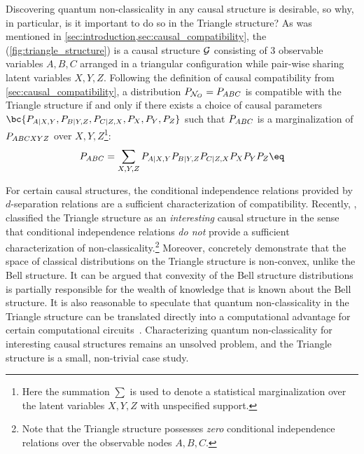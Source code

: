 \documentclass[aps, 10pt, english, twoside, pra, nofootinbib, tightenlines, longbibliography, superscriptaddress]{revtex4-1}
\begin{document}
    Discovering quantum non-classicality in any causal structure is desirable, so why, in particular, is it important to do so in the Triangle structure? As was mentioned in \cref{sec:introduction,sec:causal_compatibility}, the  (\cref{fig:triangle_structure}) is a causal structure $\mathcal{G}$ consisting of $3$ observable variables $A, B, C$ arranged in a triangular configuration while pair-wise sharing latent variables $X, Y, Z$. Following the definition of causal compatibility from \cref{sec:causal_compatibility}, a distribution $\prob[\nodes_{O}] = \prob[ABC]$ is compatible with the Triangle structure if and only if there exists a choice of causal parameters $\bc{\prob[A|X,Y],\prob[B|Y,Z],\prob[C|Z,X],\prob[X],\prob[Y],\prob[Z]}$ such that
    $\prob[ABC]$ is a marginalization of $\prob[ABCXYZ]$ over $X, Y, Z$\footnote{Here the summation $\sum$ is used to denote a statistical marginalization over the latent variables $X,Y,Z$ with unspecified support.}:
    \[ \prob[ABC] = \sum_{X,Y,Z}\prob[A|X,Y]\prob[B|Y,Z]\prob[C|Z,X]\prob[X]\prob[Y]\prob[Z] \eq \label{eq:triangle_compatibility} \]

    For certain causal structures, the conditional independence relations provided by $d$-separation relations are a sufficient characterization of compatibility. Recently, \citet{Henson_2014}, classified the Triangle structure as an \textit{interesting} causal structure in the sense that conditional independence relations \textit{do not} provide a sufficient characterization of non-classicality.\footnote{Note that the Triangle structure possesses \textit{zero} conditional independence relations over the observable nodes $A, B, C$.} Moreover, \citet{Inflation} concretely demonstrate that the space of classical distributions on the Triangle structure is non-convex, unlike the Bell structure. It can be argued that convexity of the Bell structure distributions is partially responsible for the wealth of knowledge that is known about the Bell structure. It is also reasonable to speculate that quantum non-classicality in the Triangle structure can be translated directly into a computational advantage for certain computational circuits~\cite{Terhal_2002}. Characterizing quantum non-classicality for interesting causal structures remains an unsolved problem, and the Triangle structure is a small, non-trivial case study.
\end{document}
